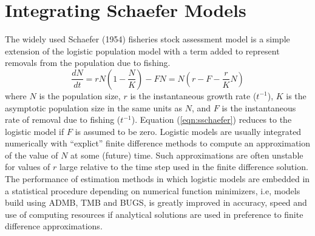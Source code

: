 \section{Integrating Schaefer Models}
\label{sec:schaefer}
The widely used Schaefer (1954) fisheries stock assessment model 
is a simple
extension of the logistic population model with a term added to
represent removals from the population due to fishing.
\begin{equation}
\label{eqn:sschaefer}
\frac{dN}{dt} = rN(1-\frac{N}{K}) - FN = N(r-F-\frac{r}{K}N)
\end{equation}
where $N$ is the population size,
$r$ is the instantaneous growth rate ($t^{-1}$),
$K$ is the asymptotic population size in the same units as $N$,
and $F$ is the instantaneous rate of removal due to fishing ($t^{-1}$).
Equation (\ref{eqn:sschaefer}) reduces to the logistic model
if $F$ is assumed to be zero.
Logistic models are usually integrated numerically with
``explict'' finite difference methods to compute an approximation 
of the value of $N$ at some (future) time. 
Such approximations are often unstable for 
values of $r$ large relative to the time step used in the finite
difference solution.
The performance of estimation methods in which logistic models
are embedded in a statistical procedure depending on numerical function
minimizers, i.e, models build using ADMB, TMB and BUGS,
is greatly improved in accuracy, speed and use of
computing resources if analytical solutions are used in preference
to finite difference approximations. 

